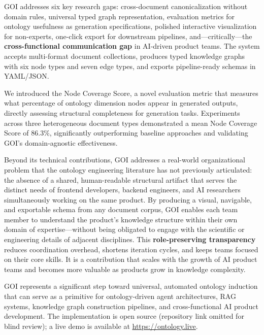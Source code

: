 \documentclass[runningheads,a4paper]{llncs}
\begin{document}
GOI addresses six key research gaps: cross-document canonicalization
without domain rules, universal typed graph representation, evaluation
metrics for ontology usefulness as generation specifications, polished
interactive visualization for non-experts, one-click export for
downstream pipelines, and---critically---the \textbf{cross-functional
communication gap} in AI-driven product teams. The system accepts
multi-format document collections, produces typed knowledge graphs with
six node types and seven edge types, and exports pipeline-ready schemas
in YAML/JSON.

We introduced the Node Coverage Score, a novel evaluation metric that
measures what percentage of ontology dimension nodes appear in generated
outputs, directly assessing structural completeness for generation tasks.
Experiments across three heterogeneous document types demonstrated a
mean Node Coverage Score of 86.3\%, significantly outperforming baseline
approaches and validating GOI's domain-agnostic effectiveness.

Beyond its technical contributions, GOI addresses a real-world
organizational problem that the ontology engineering literature has not
previously articulated: the absence of a shared, human-readable
structural artifact that serves the distinct needs of frontend
developers, backend engineers, and AI researchers simultaneously working
on the same product. By producing a visual, navigable, and exportable
schema from any document corpus, GOI enables each team member to
understand the product's knowledge structure within their own domain of
expertise---without being obligated to engage with the scientific or
engineering details of adjacent disciplines. This \textbf{role-preserving
transparency} reduces coordination overhead, shortens iteration cycles,
and keeps teams focused on their core skills. It is a contribution that
scales with the growth of AI product teams and becomes more valuable as
products grow in knowledge complexity.

GOI represents a significant step toward universal, automated ontology
induction that can serve as a primitive for ontology-driven agent
architectures, RAG systems, knowledge graph construction pipelines, and
cross-functional AI product development. The implementation is open source (repository link omitted for blind review);
a live demo is available at \url{https://ontology.live}.
\end{document}
